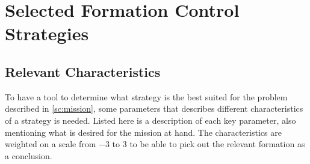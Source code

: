 \chapter{Selected Formation Control Strategies}
\label{ch:selformctrl}

\section{Relevant Characteristics}
To have a tool to determine what strategy is the best suited for the
problem described in \vref{sc:mission}, some parameters that describes
different characteristics of a strategy is needed. Listed here is a
description of each key parameter, also mentioning what is desired for
the mission at hand. The characteristics are weighted on a scale from $-3$ to $3$ to be able to pick out the relevant formation as a conclusion.

